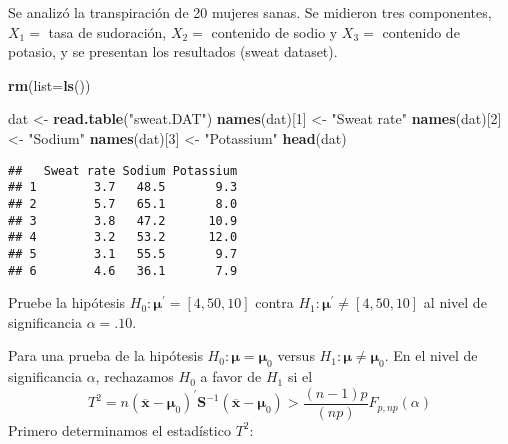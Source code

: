 \documentclass[
]{article}
\newenvironment{Shaded}{\begin{snugshade}}{\end{snugshade}}
\newcommand{\DataTypeTok}[1]{\textcolor[rgb]{0.13,0.29,0.53}{#1}}
\newcommand{\DecValTok}[1]{\textcolor[rgb]{0.00,0.00,0.81}{#1}}
\newcommand{\KeywordTok}[1]{\textcolor[rgb]{0.13,0.29,0.53}{\textbf{#1}}}
\newcommand{\NormalTok}[1]{#1}
\newcommand{\StringTok}[1]{\textcolor[rgb]{0.31,0.60,0.02}{#1}}
\begin{document}
Se analizó la transpiración de 20 mujeres sanas. Se midieron tres
componentes, \(X_{1} =\) tasa de sudoración, \(X_{2}=\) contenido de
sodio y \(X_{3} =\) contenido de potasio, y se presentan los resultados
(sweat dataset).

\begin{Shaded}
\begin{Highlighting}[]
\KeywordTok{rm}\NormalTok{(}\DataTypeTok{list=}\KeywordTok{ls}\NormalTok{())}

\NormalTok{dat <-}\StringTok{ }\KeywordTok{read.table}\NormalTok{(}\StringTok{"sweat.DAT"}\NormalTok{)}
\KeywordTok{names}\NormalTok{(dat)[}\DecValTok{1}\NormalTok{] <-}\StringTok{ "Sweat rate"}
\KeywordTok{names}\NormalTok{(dat)[}\DecValTok{2}\NormalTok{] <-}\StringTok{ "Sodium"}
\KeywordTok{names}\NormalTok{(dat)[}\DecValTok{3}\NormalTok{] <-}\StringTok{ "Potassium"}
\KeywordTok{head}\NormalTok{(dat)}
\end{Highlighting}
\end{Shaded}

\begin{verbatim}
##   Sweat rate Sodium Potassium
## 1        3.7   48.5       9.3
## 2        5.7   65.1       8.0
## 3        3.8   47.2      10.9
## 4        3.2   53.2      12.0
## 5        3.1   55.5       9.7
## 6        4.6   36.1       7.9
\end{verbatim}

Pruebe la hipótesis \(H_{0}: \boldsymbol {\mu} ^ {\prime} = [4,50,10]\)
contra \(H_{1}: \boldsymbol {\mu} ^ {\prime} \neq [4,50,10]\) al nivel
de significancia \(\alpha = .10\).

Para una prueba de la hipótesis
\(H_{0}: \boldsymbol {\mu} = \boldsymbol {\mu} _{0}\) versus
\(H_{1}: \boldsymbol { \mu} \neq \boldsymbol {\mu} _{0}.\) En el nivel
de significancia \(\alpha\), rechazamos \(H_{0}\) a favor de \(H_{1}\)
si el \[
T ^ {2} = n \left (\overline {\mathbf {x}} - \boldsymbol {\mu} _{0} \right) ^ {\prime} \mathbf {S} ^ {- 1} \left (\overline {\mathbf {x}} - \boldsymbol {\mu} _{0} \right)> \frac {(n-1) p} {(np)} F_{p, np} (\alpha)
\] Primero determinamos el estadístico \(T^2\):
\end{document}
